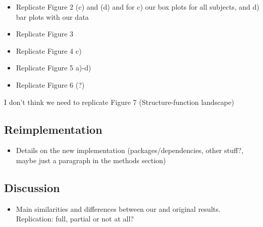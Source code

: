 \begin{itemize}
 \item 
  Replicate Figure 2 (c) and (d) 
  and for c) our box plots for all subjects, and d) bar plots with our data
  
 \item
  Replicate Figure 3 

 \item
  Replicate Figure 4 c) 
  
 \item
  Replicate Figure 5 a)-d)
  
 \item
  Replicate Figure 6 (?)
\end{itemize}

I don't think we need to replicate Figure 7 (Structure-function landscape)

\subsection{Reimplementation}

\begin{itemize}
 \item 
  Details on the new implementation (packages/dependencies, other stuff?, maybe just a paragraph in the methods section) 
\end{itemize}

 




\subsection{Discussion}

\begin{itemize}
 \item 
  Main similarities and differences between our and original results. Replication: full, partial or not at all?
\end{itemize}
